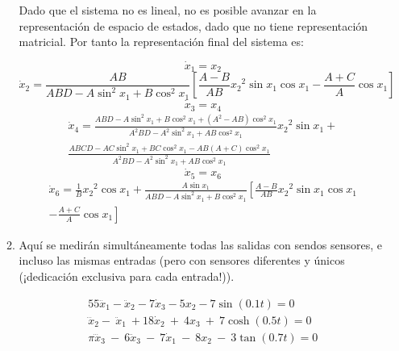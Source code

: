 \documentclass[letterpaper, 12pt]{article}
\begin{document}
\begin{enumerate}
\begin{enumerate}
Dado que el sistema no es lineal, no es posible avanzar en la representación de espacio de estados, dado que no tiene representación matricial. Por tanto la representación final del sistema es:

\begin{equation*}
    \dot{x}_1 = x_2
\end{equation*}
\begin{equation*}
    \dot{x}_2 = \frac{AB}{ABD - A\sin^2 x_1 + B\cos^2 x_1} \left[ \frac{A-B}{AB}{x_2}^2\sin x_1\cos x_1 -\frac{A+C}{A}\cos x_1\right]
\end{equation*}
\begin{equation*}
    \dot{x}_3 = x_4
\end{equation*}
\begin{multline*}
    \dot{x}_4 = \frac{ABD - A\sin^2 x_1 + B\cos^2 x_1 + (A^2-AB)\cos^2 x_1}{A^2BD-A^2\sin^2 x_1 + AB\cos^2 x_1} {x_2}^2\sin x_1 + \\
    \frac{ABCD - AC\sin^2 x_1 + BC\cos^2 x_1 - AB(A+C)\cos^2 x_1}{A^2BD - A^2\sin^2 x_1 + AB\cos^2 x_1}
\end{multline*}
\begin{equation*}
    \dot{x}_5 = x_6
\end{equation*}
\begin{multline*}
    \dot{x}_6 = \frac{1}{B}{x_2}^2\cos x_1 + \frac{A\sin x_1}{ABD-A\sin^2 x_1 + B\cos^2 x_1} \left[\frac{A-B}{AB}{x_2}^2\sin x_1\cos x_1 \right.\\ \left.-\frac{A+C}{A}\cos x_1 \right]
\end{multline*}

\item Aquí se medirán simultáneamente todas las salidas con sendos sensores, e incluso las mismas entradas (pero con sensores diferentes y únicos (¡dedicación exclusiva para cada entrada!)).

\begin{equation}
\begin{split}
    55\dddot{x}_1-\ddot{x}_2-7\dot{x}_3-5x_2-7\sin(0.1t)=0 \\
    {\dddot{x}}_2-\ {\ddot{x}}_1\ +18{\dot{x}}_2\ +\ 4x_3\ +\ 7\cosh(0.5t)=0 \\
    \pi\dddot{x}_3\ -\ 6\ddot{x}_3\ -\ 7\dot{x}_1\ -\ 8x_2\ -\ 3\tan(0.7t) =0 
\end{split}
\end{equation}


\end{enumerate}
\end{enumerate}
\end{document}
